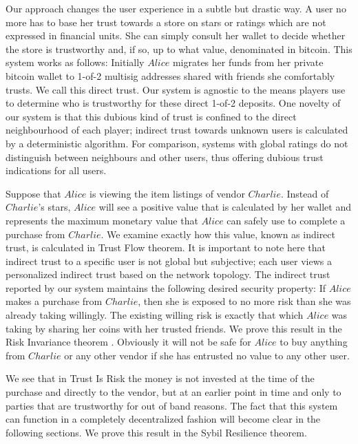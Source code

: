   Our approach changes the user experience in a subtle but drastic way. A user no more has to base her trust towards a store
  on stars or ratings which are not expressed in financial units. She can simply consult her wallet to decide whether the
  store is trustworthy and, if so, up to what value, denominated in bitcoin. This system works as follows: Initially $Alice$
  migrates her funds from her private bitcoin wallet to 1-of-2 multisig addresses shared with friends she comfortably trusts.
  We call this direct trust. Our system is agnostic to the means players use to determine who is trustworthy for these direct
  1-of-2 deposits. One novelty of our system is that this dubious kind of trust is confined to the direct neighbourhood of
  each player; indirect trust towards unknown users is calculated by a deterministic algorithm.  For comparison, systems with
  global ratings do not distinguish between neighbours and other users, thus offering dubious trust indications for all users.

  Suppose that $Alice$ is viewing the item listings of vendor $Charlie$. Instead of $Charlie$'s stars, $Alice$ will see a
  positive value that is calculated by her wallet and represents the maximum monetary value that $Alice$ can safely use to
  complete a purchase from $Charlie$. We examine exactly how this value, known as indirect trust, is calculated in Trust Flow
  theorem. It is important to note here that indirect trust to a specific user is not global but subjective; each user views a
  personalized indirect trust based on the network topology. The indirect trust reported by our system maintains the following
  desired security property: If $Alice$ makes a purchase from $Charlie$, then she is exposed to no more risk than she was
  already taking willingly. The existing willing risk is exactly that which $Alice$ was taking by sharing her coins with her
  trusted friends. We prove this result in the Risk Invariance theorem . Obviously it will not be safe for $Alice$ to buy
  anything from $Charlie$ or any other vendor if she has entrusted no value to any other user.

  We see that in Trust Is Risk the money is not invested at the time of the purchase and directly to the vendor, but at an
  earlier point in time and only to parties that are trustworthy for out of band reasons. The fact that this system can
  function in a completely decentralized fashion will become clear in the following sections. We prove this result in the
  Sybil Resilience theorem.

